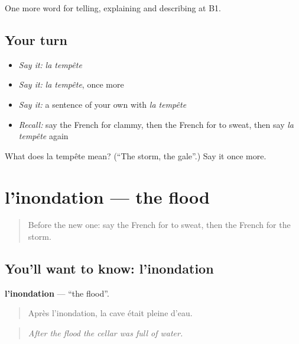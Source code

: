 \begin{grammarlens}[title={What you've built}]
One more word for telling, explaining and describing at B1.
\end{grammarlens}

\subsection*{Your turn}
\begin{itemize}
\raggedright
  \item \emph{Say it:} \emph{la tempête}
  \item \emph{Say it:} \emph{la tempête}, once more
  \item \emph{Say it:} a sentence of your own with \emph{la tempête}
  \item \emph{Recall:} say the French for clammy, then the French for to sweat, then say \emph{la tempête} again
\end{itemize}

\begin{tcolorbox}[breakable,colback=teal!4,colframe=teal!35!black,title={Before you move on}]
What does la tempête mean? (\textquotedblleft{}The storm, the gale\textquotedblright{}.) Say it once more.
\end{tcolorbox}
\section[l'inondation]{l'inondation — the flood}

\label{lesson:FR-C465-inondation}



\begin{quote}
Before the new one: say the French for to sweat, then the French for the storm.
\end{quote}

\subsection*{You'll want to know: l'inondation}
\textbf{l'inondation} — \textquotedblleft{}the flood\textquotedblright{}.

\begin{quote}
Après l'inondation, la cave était pleine d'eau.
\end{quote}

\begin{quote}
\emph{After the flood the cellar was full of water.}
\end{quote}

